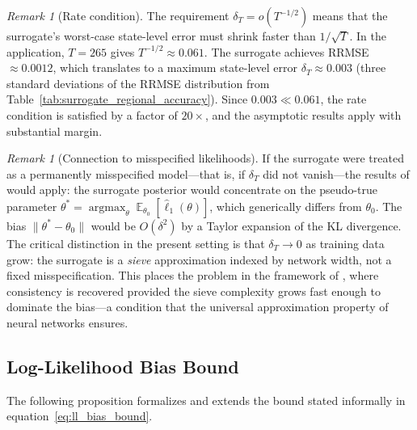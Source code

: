 \documentclass[12pt]{article}
\theoremstyle{plain}
\theoremstyle{definition}
\theoremstyle{remark}
\newtheorem{remark}[theorem]{Remark}
\DeclareMathOperator{\E}{\mathbb{E}}
\DeclareMathOperator{\argmax}{argmax}
\begin{document}
\begin{remark}[Rate condition]
\label{rem:rate_condition}
The requirement $\delta_T = o(T^{-1/2})$ means that the surrogate's worst-case state-level error must shrink faster than $1/\sqrt{T}$. In the application, $T = 265$ gives $T^{-1/2} \approx 0.061$. The surrogate achieves RRMSE $\approx 0.0012$, which translates to a maximum state-level error $\delta_T \approx 0.003$ (three standard deviations of the RRMSE distribution from Table~\ref{tab:surrogate_regional_accuracy}). Since $0.003 \ll 0.061$, the rate condition is satisfied by a factor of $20\times$, and the asymptotic results apply with substantial margin.
\end{remark}

\begin{remark}[Connection to misspecified likelihoods]
\label{rem:misspecified}
If the surrogate were treated as a permanently misspecified model---that is, if $\delta_T$ did not vanish---the results of \citet{kleijn2012bernstein} would apply: the surrogate posterior would concentrate on the pseudo-true parameter $\theta^* = \argmax_\theta \E_{\theta_0}[\hat{\ell}_1(\theta)]$, which generically differs from $\theta_0$. The bias $\|\theta^* - \theta_0\|$ would be $O(\delta^2)$ by a Taylor expansion of the KL divergence. The critical distinction in the present setting is that $\delta_T \to 0$ as training data grow: the surrogate is a \emph{sieve} approximation indexed by network width, not a fixed misspecification. This places the problem in the framework of \citet{mueller2013risk}, where consistency is recovered provided the sieve complexity grows fast enough to dominate the bias---a condition that the universal approximation property of neural networks ensures.
\end{remark}

\subsection{Log-Likelihood Bias Bound}

The following proposition formalizes and extends the bound stated informally in equation~\eqref{eq:ll_bias_bound}.
\end{document}
